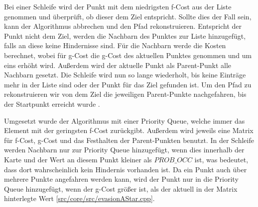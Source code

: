 Bei einer Schleife wird der Punkt mit dem niedrigsten f-Cost aus der Liste genommen und überprüft, ob dieser dem Ziel entspricht. 
Sollte dies der Fall sein, kann der Algorithmus abbrechen und den Pfad rekonstruieren. 
Entspricht der Punkt nicht dem Ziel, werden die Nachbarn des Punktes zur Liste hinzugefügt, falls an diese keine Hindernisse sind. 
Für die Nachbarn werde die Kosten berechnet, wobei für g-Cost die g-Cost des aktuellen Punktes genommen und um eins erhöht wird. 
Außerdem wird der aktuelle Punkt als Parent-Punkt alle Nachbarn gesetzt. 
Die Schleife wird nun so lange wiederholt, bis keine Einträge mehr in der Liste sind oder der Punkt für das Ziel gefunden ist. 
Um den Pfad zu rekonstruieren wir von dem Ziel die jeweiligen Parent-Punkte nachgefahren, bis der Startpunkt erreicht wurde \cite{hartFormalBasisHeuristic1968}. 

Umgesetzt wurde der Algorithmus mit einer Priority Queue, welche immer das Element mit der geringsten f-Cost zurückgibt.
 Außerdem wird jeweils eine Matrix für f-Cost, g-Cost und das Festhalten der Parent-Punkten benutzt. 
 In der Schleife werden Nachbarn nur zur Priority Queue hinzugefügt, wenn dies innerhalb der Karte und der Wert an diesem Punkt kleiner als \(PROB\_OCC\) ist, 
 was bedeutet, dass dort wahrscheinlich kein Hindernis vorhanden ist. 
 Da ein Punkt auch über mehrere Punkte angefahren werden kann, wird der Punkt nur in die Priority Queue hinzugefügt, 
 wenn der g-Cost größer ist, als der aktuell in der Matrix hinterlegte Wert 
 [\href{https://github.com/Jundy0/Studienarbeit/blob/main/src/core/src/evasionAStar.cpp}{src/core/src/evasionAStar.cpp}]. 

